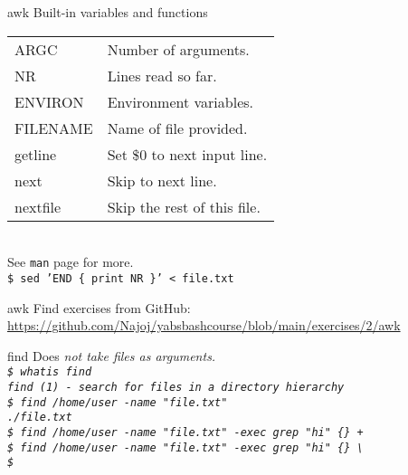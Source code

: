 \documentclass{beamer}
\let\tt\texttt
\let\it\itshape
\begin{document}
\begin{frame}{awk}
        Built-in variables and functions\\
        \begin{tabular}{l|l}
                \hline
            ARGC     & Number of arguments. \\
            NR       & Lines read so far.   \\
            ENVIRON  & Environment variables. \\
            FILENAME & Name of file provided. \\
                \hline
            getline  & Set \$0 to next input line. \\
            next     & Skip to next line. \\
            nextfile & Skip the rest of this file. \\
                \hline
        \end{tabular} \\
        \medskip
        See \tt{man} page for more. \\
        \tt{\$ sed 'END \{ print NR \}' < file.txt} \\
\end{frame}

\begin{frame}{awk}
        Find exercises from GitHub: \\
        \url{https://github.com/Najoj/yabsbashcourse/blob/main/exercises/2/awk}
\end{frame}

\begin{frame}{find}
        Does \it{not} take files as arguments. \\
        \tt{\$ whatis find}\\
        \tt{find (1)  - search for files in a directory hierarchy}\\
        \tt{\$ find /home/user -name "file.txt"} \\
        \tt{./file.txt} \\
        \tt{\$ find /home/user -name "file.txt" -exec grep "hi" \{\} + } \\
        \tt{\$ find /home/user -name "file.txt" -exec grep "hi" \{\} {\textbackslash}\; } \\
        \tt{\$ } \\
\end{frame}
\end{document}
